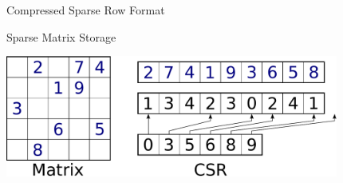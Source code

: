 % 
% 
% 
% 
% 
% 
% 
% 
% 


\begin{frame}{Compressed Sparse Row Format}

 \begin{block}{Sparse Matrix Storage}
\begin{center}
 \begin{center}{\includegraphics[height=40mm]{figures/matrix_csr}}\end{center}
\end{center}
 \end{block}


\end{frame}


